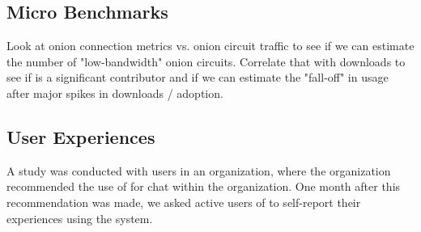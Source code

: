 \subsection{Micro Benchmarks}

Look at onion connection metrics vs. onion circuit traffic to see if we can
estimate the number of "low-bandwidth" onion circuits. Correlate that with
downloads to see if \systemname is a significant contributor and if we can
estimate the "fall-off" in usage after major spikes in downloads / adoption.


\subsection{User Experiences}

A study was conducted with  users in an organization, where the
organization recommended the use of \systemname for chat within the
organization. One month after this recommendation was made, we asked active
users of \systemname to self-report their experiences using the system.



